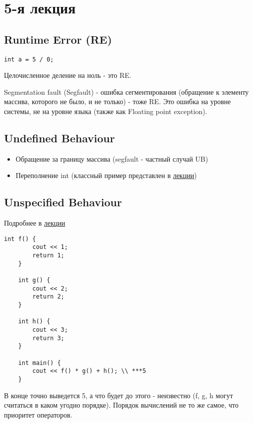 \section{5-я лекция}

\subsection{Runtime Error (RE)}

\begin{Verbatim}[tabsize=4]
int a = 5 / 0;
\end{Verbatim}

Целочисленное деление на ноль - это RE.

Segmentation fault (Segfault) - ошибка сегментирования (обращение к элементу массива, которого не было, и не только) - тоже RE. Это ошибка на уровне системы, не на уровне языка (также как Floating point exception).

\subsection{Undefined Behaviour}

\begin{itemize}
	\item Обращение за границу массива (segfault - частный случай UB)
	\item Переполнение int (классный пример представлен в \href{https://youtu.be/swyvjLAV9-k?t=1461}{лекции})
\end{itemize}

\subsection{Unspecified Behaviour}
Подробнее в \href{https://youtu.be/swyvjLAV9-k?t=1702}{лекции}

\begin{Verbatim}[tabsize=4]
	int f() {
		cout << 1;
		return 1;
	}
	
	int g() {
		cout << 2;
		return 2;
	}
	
	int h() {
		cout << 3;
		return 3;
	}
	
	int main() {
		cout << f() * g() + h(); \\ ***5
	}
\end{Verbatim}

В конце точно выведется 5, а что будет до этого - неизвестно (f, g, h могут считаться в каком угодно порядке). Порядок вычислений не то же самое, что приоритет операторов.



